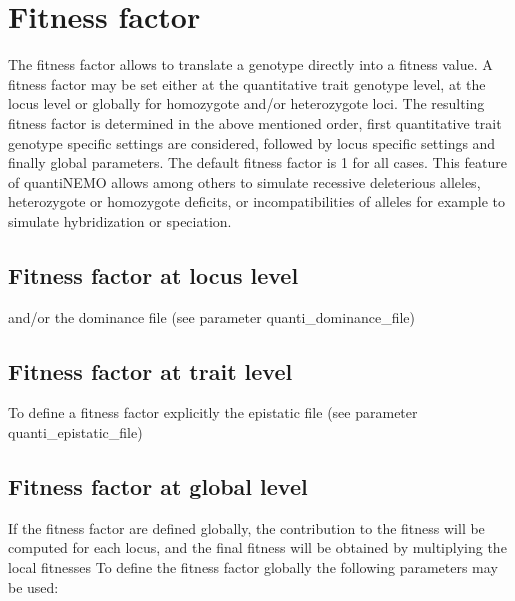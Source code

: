 \documentclass[letterpaper,12pt,oneside]{book}
\begin{document}
\section{Fitness factor}\label{fitnessFactor}
The fitness factor allows to translate a genotype directly into a fitness value. A fitness factor may be set either at the quantitative trait genotype level, at the locus level  or globally for homozygote and/or heterozygote loci. The resulting fitness factor is determined in the above mentioned order, first quantitative trait genotype specific settings are considered, followed by locus specific settings and finally global parameters. The default fitness factor is 1 for all cases. This feature of quantiNEMO allows among others to simulate recessive deleterious alleles, heterozygote or homozygote deficits, or incompatibilities of alleles for example to simulate hybridization or speciation. 

\subsection{Fitness factor at locus level}
 and/or the dominance file (see parameter \textsf{quanti\_dominance\_file})
\subsection{Fitness factor at trait level}
To define a fitness factor explicitly the epistatic file (see parameter \textsf{quanti\_epistatic\_file})
\subsection{Fitness factor at global level}
If the fitness factor are defined globally, the contribution to the fitness will be computed for each locus, and the final fitness will be obtained by multiplying the local fitnesses  To define the fitness factor globally the following parameters may be used:
    
\end{document}
